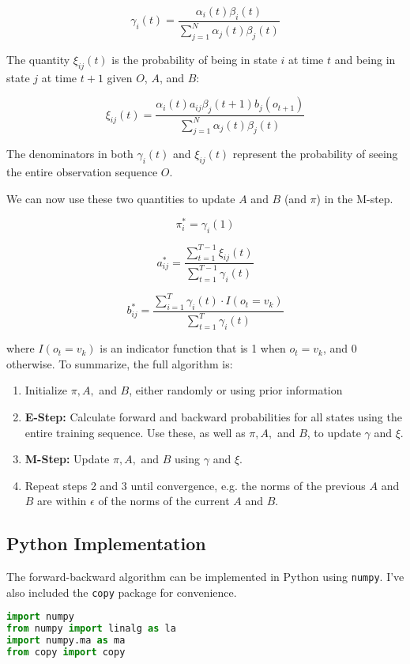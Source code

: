 \documentclass[14pt]{article}
\begin{document}
$$\gamma_i(t) = \frac{\alpha_i(t)\beta_i(t)}{\sum_{j=1}^N \alpha_j(t)\beta_j(t)}$$

The quantity $\xi_{ij}(t)$ is the probability of being in state $i$ at time $t$ and being in state $j$ at time $t+1$ given $O$, $A$, and $B$:

$$\xi_{ij}(t) = \frac{\alpha_i(t)a_{ij}\beta_j(t+1)b_j(o_{t+1})}{\sum_{j=1}^N \alpha_j(t)\beta_j(t)}$$

The denominators in both $\gamma_i(t)$ and $\xi_{ij}(t)$ represent the probability of seeing the entire observation sequence $O$.

We can now use these two quantities to update $A$ and $B$ (and $\pi$) in the M-step.

$$\pi^*_i = \gamma_i(1)$$

$$a^*_{ij} = \frac{\sum_{t=1}^{T-1}\xi_{ij}(t)}{\sum_{t=1}^{T-1}\gamma_i(t)}$$

$$b^*_{ij} = \frac{\sum_{i=1}^T \gamma_i(t)\cdot I(o_t = v_k)}{\sum_{t=1}^T \gamma_i(t)}$$

where $I(o_t = v_k)$ is an indicator function that is 1 when $o_t = v_k$, and 0 otherwise.  To summarize, the full algorithm is:
\begin{enumerate}
\item Initialize $\pi, A,$ and $B$, either randomly or using prior information
\item \textbf{E-Step:} Calculate forward and backward probabilities for all states using the entire training sequence.  Use these, as well as $\pi, A,$ and $B$, to update $\gamma$ and $\xi$.
\item \textbf{M-Step:} Update $\pi, A,$ and $B$ using $\gamma$ and $\xi$.
\item Repeat steps 2 and 3 until convergence, e.g. the norms of the previous $A$ and $B$ are within $\epsilon$ of the norms of the current $A$ and $B$.
\end{enumerate}

\begin{center}
\subsection*{Python Implementation}
\end{center}

The forward-backward algorithm can be implemented in Python using \texttt{numpy}.  I've also included the \texttt{copy} package for convenience.

\begin{lstlisting}[language=Python]
import numpy
from numpy import linalg as la
import numpy.ma as ma
from copy import copy
\end{lstlisting}
\end{document}
